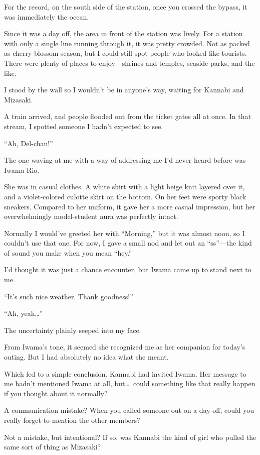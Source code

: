 \documentclass[
    a4paper,
    12pt,
    twoside,
    openany,
    UTF8,
    fontset=windows
]{ctexbook}
\begin{document}
For the record, on the south side of the station, once you crossed the bypass, it was immediately the ocean.

Since it was a day off, the area in front of the station was lively. For a station with only a single line running through it, it was pretty crowded. Not as packed as cherry blossom season, but I could still spot people who looked like tourists. There were plenty of places to enjoy---shrines and temples, seaside parks, and the like.

I stood by the wall so I wouldn't be in anyone's way, waiting for Kannabi and Mizasaki.

A train arrived, and people flooded out from the ticket gates all at once. In that stream, I spotted someone I hadn't expected to see.

``Ah, Del-chan!''

The one waving at me with a way of addressing me I'd never heard before was---Iwama Rio.

She was in casual clothes. A white shirt with a light beige knit layered over it, and a violet-colored culotte skirt on the bottom. On her feet were sporty black sneakers. Compared to her uniform, it gave her a more casual impression, but her overwhelmingly model-student aura was perfectly intact.

Normally I would've greeted her with ``Morning,'' but it was almost noon, so I couldn't use that one. For now, I gave a small nod and let out an ``ss''---the kind of sound you make when you mean ``hey.''

I'd thought it was just a chance encounter, but Iwama came up to stand next to me.

``It's such nice weather. Thank goodness!''

``Ah, yeah\dots''

The uncertainty plainly seeped into my face.

From Iwama's tone, it seemed she recognized me as her companion for today's outing. But I had absolutely no idea what she meant.

Which led to a simple conclusion. Kannabi had invited Iwama. Her message to me hadn't mentioned Iwama at all, but\dots\ could something like that really happen if you thought about it normally?

A communication mistake? When you called someone out on a day off, could you really forget to mention the other members?

Not a mistake, but intentional? If so, was Kannabi the kind of girl who pulled the same sort of thing as Mizasaki?
\end{document}
